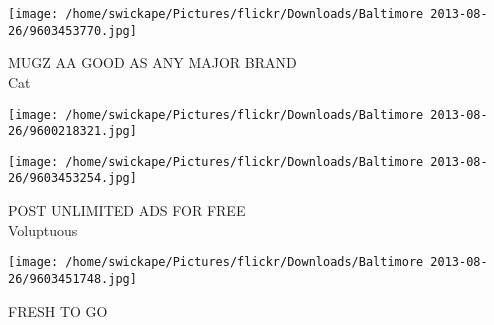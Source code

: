 \documentclass[10pt,letterpaper]{article}
\begin{document}
\vspace{0.25in}
\texttt{[image: /home/swickape/Pictures/flickr/Downloads/Baltimore 2013-08-26/9603453770.jpg]}

MUGZ AA GOOD AS ANY MAJOR BRAND\\
Cat
\pagebreak

\texttt{[image: /home/swickape/Pictures/flickr/Downloads/Baltimore 2013-08-26/9600218321.jpg]}

\vspace{0.25in}
\texttt{[image: /home/swickape/Pictures/flickr/Downloads/Baltimore 2013-08-26/9603453254.jpg]}

POST UNLIMITED ADS FOR FREE\\
Voluptuous
\pagebreak

\texttt{[image: /home/swickape/Pictures/flickr/Downloads/Baltimore 2013-08-26/9603451748.jpg]}

FRESH TO GO
\pagebreak
\end{document}
